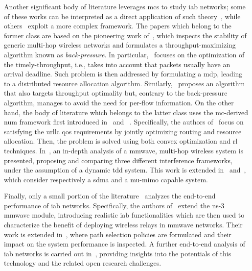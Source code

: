 Another significant body of literature leverages \glspl{mc} to study \gls{iab} networks; some of these works can be interpreted as a direct application of such theory~\cite{singh2018throughput, ji2012throughput}, while others~\cite{vu2018path,garcia2015analysis, gomez2016optimal, gomez2019optimal} exploit a more complex framework.  
The papers which belong to the former class are based on the  pioneering work of~\cite{tassiulas1990stability}, which inspects the stability of generic multi-hop wireless networks and formulates a throughput-maximizing algorithm known as \textit{back-pressure}. In particular,~\cite{singh2018throughput} focuses on the optimization of the timely-throughput, i.e., takes into account that packets usually have an arrival deadline. Such problem is then addressed by formulating a \gls{mdp}, leading to a distributed resource allocation algorithm. Similarly,~\cite{ji2012throughput} proposes an algorithm that also targets throughput optimality but, contrary to the back-pressure algorithm, manages to avoid the need for per-flow information.
On the other hand, the body of literature which belongs to the latter class uses the \gls{mc}-derived \gls{num} framework first introduced in~\cite{kelly1997charging} and ~\cite{kelly1998rate}. Specifically, the authors of~\cite{vu2018path} focus on satisfying the \gls{urllc} \gls{qos} requirements by jointly optimizing routing and resource allocation. Then, 
the problem is solved using both convex optimization and \gls{rl} techniques. In~\cite{garcia2015analysis}, an in-depth analysis of a \gls{mmwave}, multi-hop wireless system is presented, proposing and comparing three different interference frameworks, under the assumption of a dynamic \gls{tdd} system. This work is extended in~\cite{gomez2016optimal} and~\cite{gomez2019optimal}, which consider respectively a \gls{sdma} and a \gls{mu}-\gls{mimo} capable system.

Finally, only a small portion of the literature~\cite{polese2018end, polese2018iab, polese2020integrated} analyzes the end-to-end performance of \gls{iab} networks. Specifically, the authors of~\cite{polese2018end} extend the ns-3 \gls{mmwave} module, introducing realistic \gls{iab} functionalities which are then used to characterize the benefit of deploying wireless relays in \gls{mmwave} networks. Their work is extended in~\cite{polese2018iab}, where path selection policies are formulated and their impact on the system performance is inspected. A further end-to-end analysis of \gls{iab} networks is carried out in~\cite{polese2020integrated}, providing insights into the potentials of this technology and the related open research challenges.

